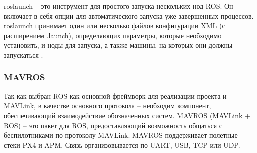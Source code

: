 roslaunch -- это инструмент для простого запуска нескольких нод ROS. Он включает в себя опции для автоматического запуска уже завершенных процессов. roslaunch принимает один или несколько файлов конфигурации XML (с расширением .launch), определяющих параметры, которые необходимо установить, и ноды для запуска, а также машины, на которых они должны запускаться \cite{ros}.

\subsubsection{MAVROS}
Так как выбран ROS как основной фреймворк для реализации проекта и MAVLink, в качестве основного протокола -- необходим компонент, обеспечивающий взаимодействие обозначенных систем.
MAVROS (MAVLink + ROS) -- это пакет для ROS, предоставляющий возможность общаться с беспилотниками по протоколу MAVLink. MAVROS поддерживает полетные стеки PX4 и APM. Связь организовывается по UART, USB, TCP или UDP.

